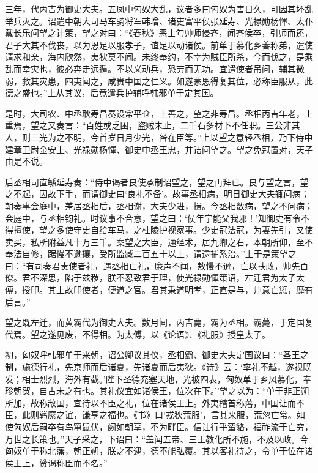 \documentclass[]{article}
\begin{document}
三年，代丙吉为御史大夫。五凤中匈奴大乱，议者多曰匈奴为害日久，可因其坏乱举兵灭之。诏遣中朝大司马车骑将军韩增、诸吏富平侯张延寿、光禄勋杨惲、太仆戴长乐问望之计策，望之对曰：``《春秋》恶士匄帅师侵齐，闻齐侯卒，引师而还，君子大其不伐丧，以为恩足以服孝子，谊足以动诸侯。前单于慕化乡善称弟，遣使请求和亲，海内欣然，夷狄莫不闻。未终奉约，不幸为贼臣所杀，今而伐之，是乘乱而幸灾也，彼必奔走远遁。不以义动兵，恐劳而无功。宜遣使者吊问，辅其微弱，救其灾患，四夷闻之，咸贵中国之仁义。如遂蒙恩得复其位，必称臣服从，此德之盛也。''上从其议，后竟遣兵护辅呼韩邪单于定其国。

是时，大司农、中丞耿寿昌奏设常平仓，上善之，望之非寿昌。丞相丙吉年老，上重焉，望之又奏言：``百姓或乏困，盗贼未止，二千石多材下不任职。三公非其人，则三光为之不明，今首岁日月少光，咎在臣等。''上以望之意轻丞相，乃下侍中建章卫尉金安上、光禄勋杨惲、御史中丞王忠，并诘问望之。望之免冠置对，天子由是不说。

后丞相司直緐延寿奏：``侍中谒者良使承制诏望之，望之再拜已。良与望之言，望之不起，因故下手，而谓御史曰`良礼不备'。故事丞相病，明日御史大夫辄问病；朝奏事会庭中，差居丞相后，丞相谢，大夫少进，揖。今丞相数病，望之不问病；会庭中，与丞相钧礼。时议事不合意，望之曰：`侯年宁能父我邪！'知御史有令不得擅使，望之多使守史自给车马，之杜陵护视家事。少史冠法冠，为妻先引，又使卖买，私所附益凡十万三千。案望之大臣，通经术，居九卿之右，本朝所仰，至不奉法自修，踞慢不逊攘，受所监臧二百五十以上，请逮捕系治。''上于是策望之曰：``有司奏君责使者礼，遇丞相亡礼，廉声不闻，敖慢不逊，亡以扶政，帅先百僚。君不深思，陷于兹秽，朕不忍致君于理，使光禄勋惲策诏，左迁君为太子太傅，授印。其上故印使者，便道之官。君其秉道明孝，正直是与，帅意亡愆，靡有后言。''

望之既左迁，而黄霸代为御史大夫。数月间，丙吉薨，霸为丞相。霸薨，于定国复代焉。望之遂见废，不得相。为太傅，以《论语》、《礼服》授皇太子。

初，匈奴呼韩邪单于来朝，诏公卿议其仪，丞相霸、御史大夫定国议曰：``圣王之制，施德行礼，先京师而后诸夏，先诸夏而后夷狄。《诗》云：`率礼不越，遂视既发；相士烈烈，海外有截。'陛下圣德充塞天地，光被四表，匈奴单于乡风慕化，奉珍朝贺，自古未之有也。其礼仪宜如诸侯王，位次在下。''望之以为：``单于非正朔所加，故称敌国，宜待以不臣之礼，位在诸侯王上。外夷稽首称藩，中国让而不臣，此则羁縻之谊，谦亨之福也。《书》曰`戎狄荒服'，言其来服，荒忽亡常。如使匈奴后嗣卒有鸟窜鼠伏，阙如朝享，不为畔臣。信让行乎蛮貉，福祚流于亡穷，万世之长策也。''天子采之，下诏曰：``盖闻五帝、三王教化所不施，不及以政。今匈奴单于称北藩，朝正朔，朕之不逮，德不能弘覆。其以客礼待之，令单于位在诸侯王上，赞谒称臣而不名。''
\end{document}
